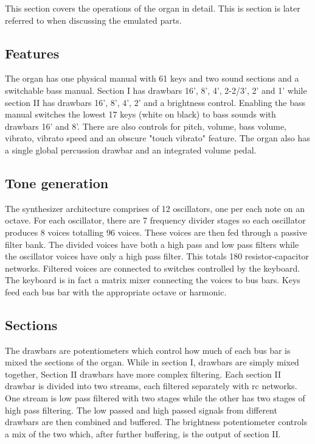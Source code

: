 \documentclass[11pt,a4paper]{article}
\begin{document}
This section covers the operations of the organ in detail\cite{yamaha:yc20}. This is section is later referred to when discussing the emulated parts.

\subsection{Features}

The organ has one physical manual with 61 keys and two sound sections and a switchable bass manual. Section I has drawbars 16', 8', 4', 2-2/3', 2' and 1' while section II has drawbars 16', 8', 4', 2' and a brightness control. Enabling the bass manual switches the lowest 17 keys (white on black) to bass sounds with drawbars 16' and 8'. There are also controls for pitch, volume, bass volume, vibrato, vibrato speed and an obscure "touch vibrato" feature. The organ also has a single global percussion drawbar and an integrated volume pedal.

\subsection{Tone generation}

The synthesizer architecture comprises of 12 oscillators, one per each note on an octave. For each oscillator, there are 7 frequency divider stages so each oscillator produces 8 voices totalling 96 voices. These voices are then fed through a passive filter bank. The divided voices have both a high pass and low pass filters while the oscillator voices have only a high pass filter. This totals 180 resistor-capacitor networks. Filtered voices are connected to switches controlled by the keyboard. The keyboard is in fact a matrix mixer connecting the voices to bus bars. Keys feed each bus bar with the appropriate octave or harmonic.

\subsection{Sections}

The drawbars are potentiometers which control how much of each bus bar is mixed the sections of the organ. While in section I, drawbars are simply mixed together, Section II drawbars have more complex filtering. Each section II drawbar is divided into two streams, each filtered separately with rc networks. One stream is low pass filtered with two stages while the other has two stages of high pass filtering. The low passed and high passed signals from different drawbars are then combined and buffered. The brightness potentiometer controls a mix of the two which, after further buffering, is the output of section II. 
\end{document}
